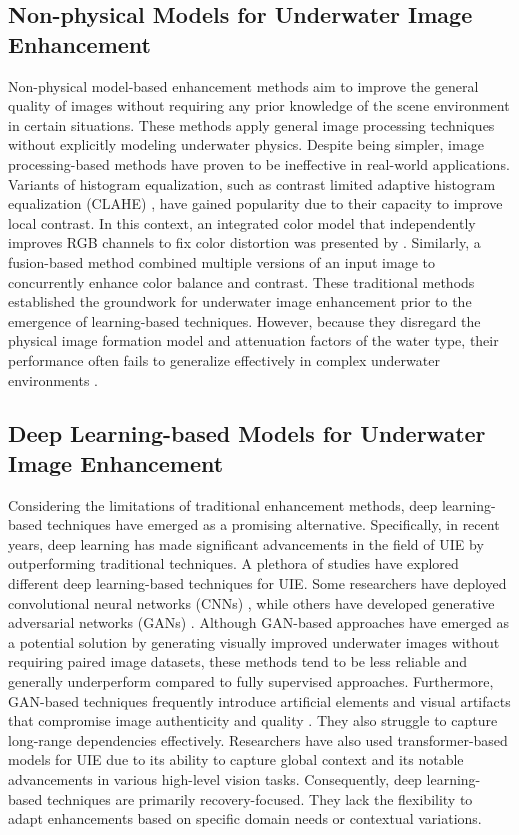 \documentclass[3p,12pt,authoryear]{elsarticle}
\begin{document}
\subsection{Non-physical Models for Underwater Image Enhancement}
Non-physical model-based enhancement methods aim to improve the general quality of images without requiring any prior knowledge of the scene environment in certain situations. These methods apply general image processing techniques without explicitly modeling underwater physics. Despite being simpler, image processing-based methods have proven to be ineffective in real-world applications. Variants of histogram equalization, such as contrast limited adaptive histogram equalization (CLAHE) \cite{10.5555/180895.180940}, have gained popularity due to their capacity to improve local contrast. In this context, an integrated color model that independently improves RGB channels to fix color distortion was presented by \cite{5642311}. Similarly, a fusion-based method \cite{6247661} combined multiple versions of an input image to concurrently enhance color balance and contrast. These traditional methods established the groundwork for underwater image enhancement prior to the emergence of learning-based techniques. However, because they disregard the physical image formation model and attenuation factors of the water type, their performance often fails to generalize effectively in complex underwater environments \cite{jmse10020241}.

\subsection{Deep Learning-based Models for Underwater Image Enhancement}
Considering the limitations of traditional enhancement methods, deep learning-based techniques have emerged as a promising alternative. Specifically, in recent years, deep learning has made significant advancements in the field of UIE by outperforming traditional techniques. A plethora of studies have explored different deep learning-based techniques for UIE. Some researchers have deployed convolutional neural networks (CNNs) \cite{bb1, bb2, bb3, bb4, bb6}, while others have developed generative adversarial networks (GANs) \cite{bb7, bb8, pucci2023uwcvganunderwaterimageenhancement, bb10, bb11, 7995024, a9}. Although GAN-based approaches have emerged as a potential solution by generating visually improved underwater images without requiring paired image datasets, these methods tend to be less reliable and generally underperform compared to fully supervised approaches. Furthermore, GAN-based techniques frequently introduce artificial elements and visual artifacts that compromise image authenticity and quality \cite{10.1145/3439723}. They also struggle to capture long-range dependencies effectively. Researchers have also used transformer-based models for UIE \cite{bb12, bb13, bb14, bb15, bb16, bb17, 10484001} due to its ability to capture global context and its notable advancements in various high-level vision tasks. Consequently, deep learning-based techniques are primarily recovery-focused. They lack the flexibility to adapt enhancements based on specific domain needs or contextual variations.
\end{document}
